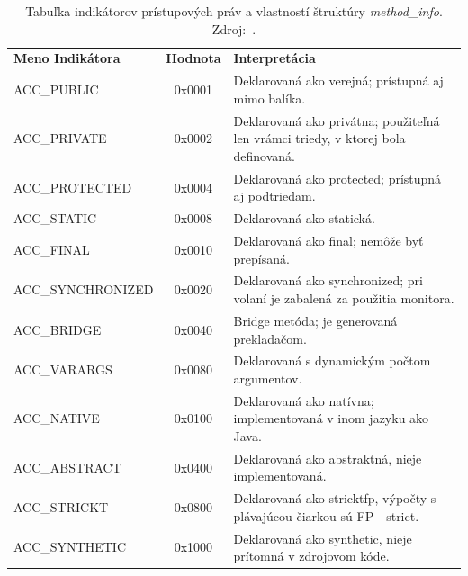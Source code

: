 \documentclass[11pt,final,oneside]{fithesis}
\begin{document}
\begin{table}
  \begin{tabular}{| l | c | p{} |}
    \hline
    \textbf{Meno Indikátora} & \textbf{Hodnota} & \textbf{Interpretácia} \\
    \hhline{|=|=|=|}
    ACC\_PUBLIC & 0x0001 & Deklarovaná ako verejná; prístupná aj mimo balíka.
    \\ \hline
    ACC\_PRIVATE & 0x0002 & Deklarovaná ako privátna; použiteľná len vrámci 
    triedy, v ktorej bola definovaná. \\ \hline
    ACC\_PROTECTED & 0x0004 & Deklarovaná ako protected; prístupná aj 
    podtriedam. \\ \hline
    ACC\_STATIC & 0x0008 & Deklarovaná ako statická. \\ \hline
    ACC\_FINAL & 0x0010 & Deklarovaná ako final; nemôže byť prepísaná.
    \\ \hline
    ACC\_SYNCHRONIZED & 0x0020 & Deklarovaná ako synchronized; pri volaní je
    zabalená za použitia monitora. \\ \hline
    ACC\_BRIDGE & 0x0040 & Bridge metóda; je generovaná prekladačom. \\ \hline
    ACC\_VARARGS & 0x0080 & Deklarovaná s dynamickým počtom argumentov.
    \\ \hline
    ACC\_NATIVE & 0x0100 & Deklarovaná ako natívna; implementovaná v inom
    jazyku ako Java. \\ \hline
    ACC\_ABSTRACT & 0x0400 & Deklarovaná ako abstraktná, nieje implementovaná.
    \\ \hline
    ACC\_STRICKT & 0x0800 & Deklarovaná ako stricktfp, výpočty s plávajúcou
    čiarkou sú FP - strict. \\ \hline
    ACC\_SYNTHETIC & 0x1000 & Deklarovaná ako synthetic, nieje prítomná v
    zdrojovom kóde. \\
    \hline
  \end{tabular}
  \caption{Tabuľka indikátorov prístupových práv a vlastností štruktúry
  \textit {method\_info}. Zdroj:~\cite{Lindholm:2013:JVM:2462629}.}
  \label{tab:tab5}
\end{table}
\end{document}
